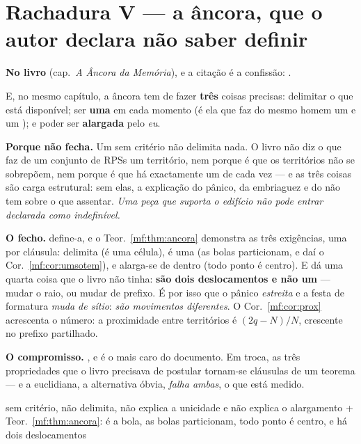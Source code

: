 \documentclass[../livro.tex]{subfiles}
\begin{document}
\section{Rachadura V --- a âncora, que o autor declara não saber definir}\label{mf:r5}

\noindent\textbf{No livro} (cap.~\emph{A Âncora da Memória}), e a citação é a
confissão: .

\noindent E, no mesmo capítulo, a âncora tem de fazer \textbf{três} coisas
precisas: delimitar o que está disponível; ser \textbf{uma} em cada momento (é
ela que faz do mesmo homem um  e um ); e poder ser \textbf{alargada} pelo \emph{eu}.

\medskip\noindent\textbf{Porque não fecha.} Um  sem critério não
delimita nada. O livro não diz o que faz de um conjunto de RPSs um território,
nem porque é que os territórios não se sobrepõem, nem porque é que há exactamente
um de cada vez --- e as três coisas são carga estrutural: sem elas, a explicação
do pânico, da embriaguez e do  não tem sobre o que
assentar. \emph{Uma peça que suporta o edifício não pode entrar declarada como
indefinível.}

\medskip\noindent\textbf{O fecho.}  define-a, e o
Teor.~\ref{mf:thm:ancora} demonstra as três exigências, uma por cláusula:
delimita (é uma célula), é uma (as bolas particionam, e daí o
Cor.~\ref{mf:cor:umsotem}), e alarga-se de dentro (todo ponto é centro). E dá uma
quarta coisa que o livro não tinha: \textbf{são dois deslocamentos e não um} ---
mudar o raio, ou mudar de prefixo. É por isso que o pânico \emph{estreita} e a
festa de formatura \emph{muda de sítio}: \emph{são movimentos diferentes}. O
Cor.~\ref{mf:cor:prox} acrescenta o número: a proximidade entre territórios é
$(2q-N)/N$, crescente no prefixo partilhado.

\medskip\noindent\textbf{O compromisso.} , e é o mais caro do documento.
Em troca, as três propriedades que o livro precisava de postular tornam-se
cláusulas de um teorema --- e a euclidiana, a alternativa óbvia, \emph{falha
ambas}, o que está medido.

      {sem critério, não delimita, não explica a unicidade e não explica o
       alargamento}
      { + Teor.~\ref{mf:thm:ancora}: é a bola, as bolas particionam, todo
       ponto é centro, e há dois deslocamentos}
\end{document}

